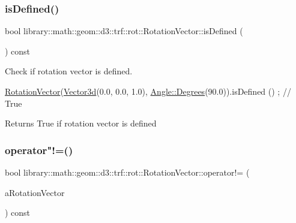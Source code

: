 \subsubsection{\texorpdfstring{is\+Defined()}{isDefined()}}
{\footnotesize\ttfamily bool library\+::math\+::geom\+::d3\+::trf\+::rot\+::\+Rotation\+Vector\+::is\+Defined (\begin{DoxyParamCaption}{ }\end{DoxyParamCaption}) const}



Check if rotation vector is defined. 


\begin{DoxyCode}
\hyperlink{classlibrary_1_1math_1_1geom_1_1d3_1_1trf_1_1rot_1_1_rotation_vector_a49076a279f457fdb14c4a9d4d61e1738}{RotationVector}(\hyperlink{namespacelibrary_1_1math_1_1obj_a977e84e9bf317a4e7dd9d6d671d6da2f}{Vector3d}(0.0, 0.0, 1.0), \hyperlink{classlibrary_1_1math_1_1geom_1_1_angle_a64aa53e8420aeb6f671d86c65c370bc8}{Angle::Degrees}(90.0)).isDefined
      () ; \textcolor{comment}{// True}
\end{DoxyCode}


\begin{DoxyReturn}{Returns}
True if rotation vector is defined 
\end{DoxyReturn}
\mbox{\label{classlibrary_1_1math_1_1geom_1_1d3_1_1trf_1_1rot_1_1_rotation_vector_a7b3ba0d46263288d9295f413c2d81e21}} 
\subsubsection{\texorpdfstring{operator"!=()}{operator!=()}}
{\footnotesize\ttfamily bool library\+::math\+::geom\+::d3\+::trf\+::rot\+::\+Rotation\+Vector\+::operator!= (\begin{DoxyParamCaption}\item[{const \hyperlink{classlibrary_1_1math_1_1geom_1_1d3_1_1trf_1_1rot_1_1_rotation_vector}{Rotation\+Vector} \&}]{a\+Rotation\+Vector }\end{DoxyParamCaption}) const}



